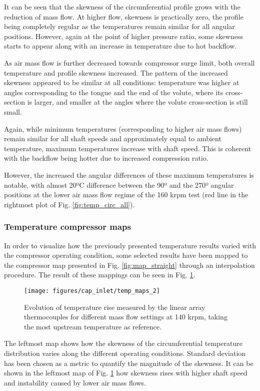 It can be seen that the skewness of the circumferential profile grows with the reduction of mass flow. At higher flow, skewness is practically zero, the profile being completely regular as the temperatures remain similar for all angular positions. However, again at the point of higher pressure ratio, some skewness starts to appear along with an increase in temperature due to hot backflow.

As air mass flow is further decreased towards compressor surge limit, both overall temperature and profile skewness increased. The pattern of the increased skewness appeared to be similar at all conditions: temperature was higher at angles corresponding to the tongue and the end of the volute, where its cross-section is larger, and smaller at the angles where the volute cross-section is still small.

Again, while minimum temperatures (corresponding to higher air mass flows) remain similar for all shaft speeds and approximately equal to ambient temperature, maximum temperatures increase with shaft speed. This is coherent with the backflow being hotter due to increased compression ratio.

However, the increased the angular differences of these maximum temperatures is notable, with almost 20ºC difference between the 90º and the 270º angular positions at the lower air mass flow regime of the 160 krpm test (red line in the rightmost plot of Fig. \ref{fig:temp_circ_all}).

\subsubsection{Temperature compressor maps}

In order to visualize how the previously presented temperature results varied with the compressor operating condition, some selected results have been mapped to the compressor map presented in Fig. \ref{fig:map_straight} through an interpolation procedure. The result of these mappings can be seen in Fig. \ref{fig:temp_maps}.

\begin{figure}[htb!]
\centering
\texttt{[image: figures/cap\_inlet/temp\_maps\_2]}
\caption{Evolution of temperature rise measured by the linear array thermocouples for different mass flow settings at 140 krpm, taking the most upstream temperature as reference.}
\label{fig:temp_maps}
\end{figure}

The leftmost map shows how the skewness of the circumferential temperature distribution varies along the different operating conditions. Standard deviation has been chosen as a metric to quantify the magnitude of the skewness. It can be shown in the leftmost map of Fig. \ref{fig:temp_maps} how skewness rises with higher shaft speed and instability caused by lower air mass flows.

